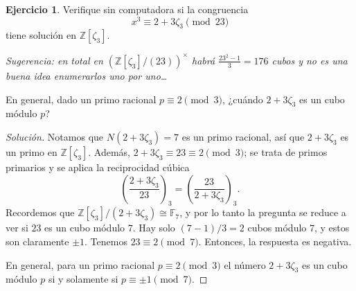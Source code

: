 \documentclass{article}
\newcounter{tarea}
\theoremstyle{definition}
\newtheorem{ejercicio}{Ejercicio}[tarea]
\newenvironment{solucion}{\begin{proof}[Solución]}{\end{proof}}
\begin{document}
\begin{ejercicio}
  Verifique sin computadora si la congruencia
  $$x^3 \equiv 2 + 3\zeta_3 \pmod{23}$$
  tiene solución en $\mathbb{Z} [\zeta_3]$.

  \emph{Sugerencia: en total en $(\mathbb{Z} [\zeta_3]/(23))^\times$ habrá
    $\frac{23^2 - 1}{3} = 176$ cubos y no es una buena idea enumerarlos uno por
    uno\dots}

  En general, dado un primo racional $p \equiv 2 \pmod{3}$, ¿cuándo
  $2 + 3\zeta_3$ es un cubo módulo $p$?

  \ifdefined\solutions
  \begin{solucion}
    Notamos que $N (2 + 3\zeta_3) = 7$ es un primo racional, así que
    $2 + 3\zeta_3$ es un primo en $\mathbb{Z} [\zeta_3]$. Además,
    $2 + 3\zeta_3 \equiv 23 \equiv 2 \pmod{3}$; se trata de primos
    primarios y se aplica la reciprocidad cúbica
    $$\left(\frac{2 + 3\zeta_3}{23}\right)_3 = \left(\frac{23}{2 + 3\zeta_3}\right)_3.$$
    Recordemos que $\mathbb{Z} [\zeta_3]/(2 + 3\zeta_3) \cong \mathbb{F}_7$,
    y por lo tanto la pregunta se reduce a ver si $23$ es un cubo módulo $7$.
    Hay solo $(7-1)/3 = 2$ cubos módulo $7$, y estos son claramente $\pm 1$.
    Tenemos $23 \equiv 2 \pmod{7}$. Entonces, la respuesta es negativa.

    En general, para un primo racional $p \equiv 2 \pmod{3}$ el número
    $2 + 3\zeta_3$ es un cubo módulo $p$ si y solamente si
    $p \equiv \pm 1 \pmod{7}$.
  \end{solucion}
  \fi
\end{ejercicio}
\end{document}
